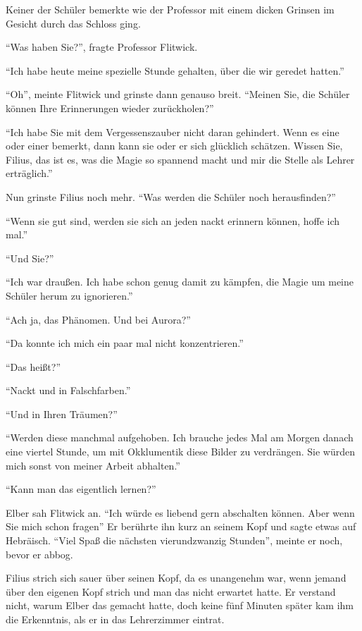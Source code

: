 Keiner der Schüler bemerkte wie der Professor mit einem dicken Grinsen im Gesicht durch das Schloss ging.

\enquote{Was haben Sie?}, fragte Professor Flitwick.

\enquote{Ich habe heute meine spezielle Stunde gehalten, über die wir geredet hatten.}

\enquote{Oh}, meinte Flitwick und grinste dann genauso breit. \enquote{Meinen Sie, die Schüler können Ihre Erinnerungen wieder zurückholen?}

\enquote{Ich habe Sie mit dem Vergessenszauber nicht daran gehindert. Wenn es eine oder einer bemerkt, dann kann sie oder er sich glücklich schätzen. \gst Wissen Sie, Filius, das ist es, was die Magie so spannend macht und mir die Stelle als Lehrer erträglich.}

Nun grinste Filius noch mehr. \enquote{Was werden die Schüler noch herausfinden?}

\enquote{Wenn sie gut sind, werden sie sich an jeden nackt erinnern können, hoffe ich mal.}

\enquote{Und Sie?}

\enquote{Ich war draußen. Ich habe schon genug damit zu kämpfen, die Magie um meine Schüler herum zu ignorieren.}

\enquote{Ach ja, das Phänomen. \gst Und bei Aurora?}

\enquote{Da konnte ich mich ein paar mal nicht konzentrieren.}

\enquote{Das heißt?}

\enquote{Nackt und in Falschfarben.}

\enquote{Und in Ihren Träumen?}

\enquote{Werden diese manchmal aufgehoben. \gst Ich brauche jedes Mal am Morgen danach eine viertel Stunde, um mit Okklumentik diese Bilder zu verdrängen. Sie würden mich sonst von meiner Arbeit abhalten.}

\enquote{Kann man das eigentlich lernen?}

Elber sah Flitwick an. \enquote{Ich würde es liebend gern abschalten können. Aber wenn Sie mich schon fragen\abs} Er berührte ihn kurz an seinem Kopf und sagte etwas auf Hebräisch. \enquote{Viel Spaß die nächsten vierundzwanzig Stunden}, meinte er noch, bevor er abbog.

Filius strich sich sauer über seinen Kopf, da es unangenehm war, wenn jemand über den eigenen Kopf strich und man das nicht erwartet hatte. Er verstand nicht, warum Elber das gemacht hatte, doch keine fünf Minuten später kam ihm die Erkenntnis, als er in das Lehrerzimmer eintrat.

